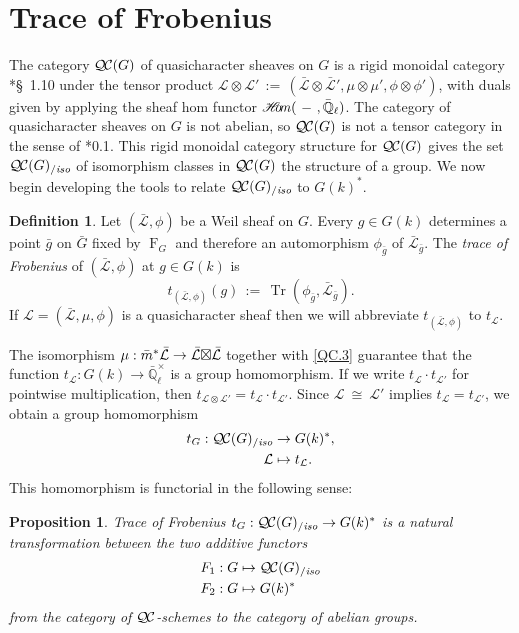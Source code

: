 \documentclass[11pt]{amsart}
\theoremstyle{plain}
\newtheorem{proposition}[theorem]{Proposition}
\theoremstyle{definition}
\newtheorem{definition}[theorem]{Definition}
\theoremstyle{remark}
\newcommand{\EE}{\mathbb{\bar Q}_\ell}
\newcommand{\Fq}{k}
\newcommand{\EEx}{\EE^\times}
\newcommand{\Frob}[1]{\operatorname{F}_{#1}}
\DeclareMathOperator{\trace}{Tr}
\newcommand{\cdef}[1]{{#1}\index{#1}}
\newcommand{\sheafHom}{{\mathscr{H}\hskip-4pt{\it o}\hskip-2pt{\it m}}}
\newcommand{\ceq}{{\, :=\, }}
\newcommand{\iso}{{\ \cong\ }}
\newcommand{\qcs}[1]{{\mathcal{#1}}}
\newcommand{\gqcs}[1]{{\mathcal{\bar #1}}}
\newcommand{\QC}{{\mathcal{Q\hskip-0.8pt C}}}
\newcommand{\QCiso}[1]{\QC(#1)_{/\textit{iso}}}
\newcommand{\trFrob}[1]{t_{#1}}
\newcommand{\bg}{\bar{g}}
\newcommand{\bm}{\bar{m}}
\newcommand{\bG}{\bar{G}}
\newcommand{\tight}[3]{\hspace{-#1pt}{#2}\hspace{-#3pt}}
\newcommand{\LxL}{\text{$\gqcs{L} \tight{0}{\boxtimes}{0} \gqcs{L}$}}
\begin{document}
\section{Trace of Frobenius}\label{sec:Frob}

The category $\QC(G)$ of quasicharacter sheaves on $G$ is a rigid monoidal category
\cite{etingof:09a}*{\S~1.10} under the tensor product
$\qcs{L} \otimes \qcs{L'} \ceq (\gqcs{L}\otimes\gqcs{L'}, \mu\otimes\mu', \phi\otimes \phi')$,
with duals given by applying the sheaf hom functor 
$\sheafHom(\ - \ ,\EE)$.
The category of quasicharacter sheaves on $G$ is not abelian, so $\QC(G)$
is not a tensor category in the sense of \cite{deligne:02a}*{0.1}.
This rigid monoidal category structure for $\QC(G)$ gives the set $\QCiso{G}$
of isomorphism classes in $\QC(G)$ the structure of a group.
We now begin developing the tools to relate $\QCiso{G}$ to $G(\Fq)^*$.

\begin{definition}\label{def:trFrob}
Let $(\gqcs{L},\phi)$ be a Weil sheaf on $G$. Every $g\in G(\Fq)$
determines a point $\bg$ on $\bG$ fixed by $\Frob{G}$ and
therefore an automorphism $\phi_{\bg}$ of $\gqcs{L}_{\bg}$. The \emph{trace of Frobenius} of $(\gqcs{L},\phi)$ at $g\in G(\Fq)$ is 
\[
\trFrob{(\gqcs{L},\phi)}(g) \ceq \trace(\phi_{\bg}, \gqcs{L}_{\bg}).
\]
If $\qcs{L} = (\gqcs{L},\mu,\phi)$ is a quasicharacter sheaf
then we will abbreviate $\trFrob{(\gqcs{L},\phi)}$ to $\trFrob{\qcs{L}}$.
\end{definition}

The isomorphism $\mu : \bm^* \gqcs{L} \to \LxL$ together with 
\ref{QC.3} guarantee
that the function $\trFrob{\qcs{L}} : G(\Fq)\to \EEx$ is a group homomorphism.  If we write
$\trFrob{\qcs{L}} \cdot \trFrob{\qcs{L'}}$ for pointwise multiplication, then 
 $\trFrob{\qcs{L}\otimes \qcs{L'}} = \trFrob{\qcs{L}} \cdot \trFrob{\qcs{L'}}$.
Since $\qcs{L} \iso \qcs{L'}$ implies $\trFrob{\qcs{L}} = \trFrob{\qcs{L'}}$,
we obtain a group homomorphism
\begin{align*}
\cdef{\trFrob{G}} : \QCiso{G} &\to G(\Fq)^*, \\
\qcs{L} &\mapsto \trFrob{\qcs{L}}.
\end{align*}
This homomorphism is functorial in the following sense:

\begin{proposition}\label{prop:functorialG}
Trace of Frobenius $\trFrob{G} : \QCiso{G} \to G(\Fq)^*$ is a natural transformation 
between the two additive functors 
\begin{align*}
F_1 : G &\mapsto \QCiso{G} \\
F_2 : G &\mapsto G(\Fq)^*
\end{align*}
from the category of $\QC$-schemes to the category of abelian groups.
\end{proposition}
\end{document}
